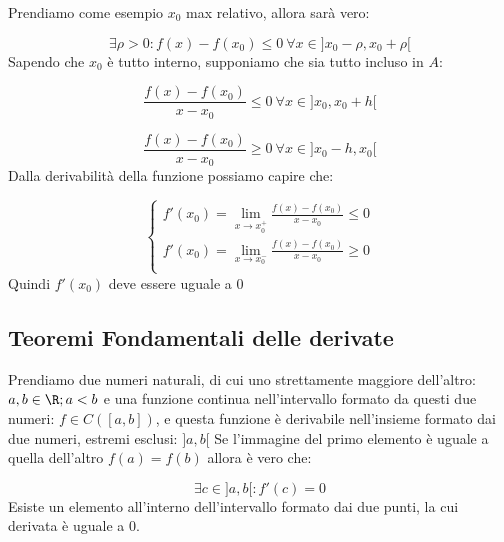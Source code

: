 \documentclass[../analisi.tex]{subfiles}
\begin{document}
\begin{dimo}
	Prendiamo come esempio $x_0$ max relativo, allora sarà vero:

	\begin{equation}
		\exists \rho > 0: f(x)- f(x_0) \leq 0\ \forall x \in ] 
			x_0 - \rho, x_0 + \rho [
	\end{equation}
	Sapendo che $x_0$ è tutto interno, supponiamo che sia tutto incluso
	in $A$:

	\begin{equation*}
		\frac{f(x)-f(x_0)}{x - x_0} \leq 0\ \forall x \in 
		] x_0, x_0 + h [
	\end{equation*}

	\begin{equation*}
		\frac{f(x)-f(x_0)}{x - x_0} \geq 0\ \forall x \in 
		] x_0 - h, x_0 [
	\end{equation*}
	Dalla derivabilità della funzione possiamo capire che:

	\begin{equation}
		\begin{cases}
			f'(x_0)= \lim_{x \to x_0^+} \frac{f(x) - f(x_0)}{x - x_0}
				\leq 0\\
			f'(x_0)= \lim_{x \to x_0^-} \frac{f(x) - f(x_0)}{x - x_0}
				\geq 0\\
		\end{cases}
	\end{equation}
	Quindi $f'(x_0)$ deve essere uguale a $0$   
\end{dimo}

\subsection{Teoremi Fondamentali delle derivate}%
\label{sub:teoremi_fondamentali_delle_derivate}

\begin{defn}[Rolle]
Prendiamo due numeri naturali, di cui uno strettamente maggiore dell'altro: 
$ a,b \in \R; a < b $ e una funzione continua nell'intervallo formato da questi 
due numeri: $ f \in C ( [a,b] )  $, e questa funzione è derivabile nell'insieme
formato dai due numeri, estremi esclusi: $ ] a,b [ $ Se l'immagine del primo 
elemento è uguale a quella dell'altro $ f ( a ) = f ( b )  $ allora 
è vero che:

\begin{equation}
	\exists c \in ]a,b[: f'( c ) = 0	
\end{equation}
Esiste un elemento all'interno dell'intervallo formato dai due punti, la cui
derivata è uguale a 0.
\end{defn}
\end{document}
